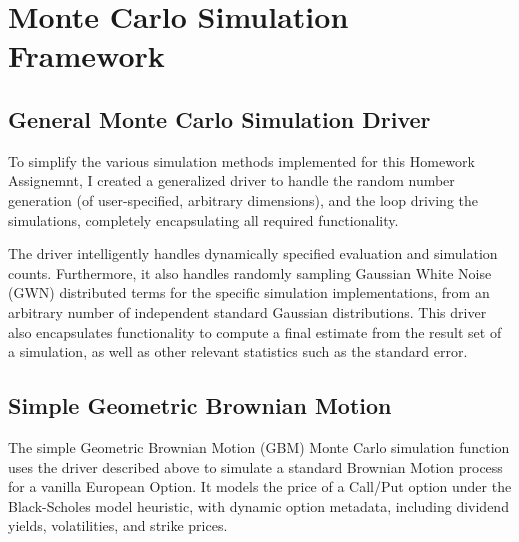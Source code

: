 \documentclass[10pt]{article}
\begin{document}

\newpage



\section{Monte Carlo Simulation Framework}

\subsection{General Monte Carlo Simulation Driver}

To simplify the various simulation methods implemented for this Homework Assignemnt, I created a generalized driver to handle the random number generation (of user-specified, arbitrary dimensions), and the loop driving the simulations, completely encapsulating all required functionality.

The driver intelligently handles dynamically specified evaluation and simulation counts. Furthermore, it also handles randomly sampling Gaussian White Noise (GWN) distributed terms for the specific simulation implementations, from an arbitrary number of independent standard Gaussian distributions. This driver also encapsulates functionality to compute a final estimate from the result set of a simulation, as well as other relevant statistics such as the standard error.

    

\subsection{Simple Geometric Brownian Motion}

The simple Geometric Brownian Motion (GBM) Monte Carlo simulation function uses the driver described above to simulate a standard Brownian Motion process for a vanilla European Option. It models the price of a Call/Put option under the Black-Scholes model heuristic, with dynamic option metadata, including dividend yields, volatilities, and strike prices.

    
\end{document}
